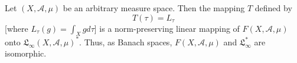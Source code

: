 Let $(X, \mathcal{A}, \mu)$ be an arbitrary measure space. Then the mapping $T$ defined by
$$T(\tau) = L_{\tau}$$
[where $L_{\tau}(g) = \int_X g d\tau$] is a norm-preserving linear mapping of $F(X, \mathcal{A}, \mu)$ onto $\mathfrak{L}_{\infty}(X, \mathcal{A}, \mu)^*$. Thus, as Banach spaces, $F(X, \mathcal{A}, \mu)$ and $\mathfrak{L}_{\infty}^*$ are isomorphic.
